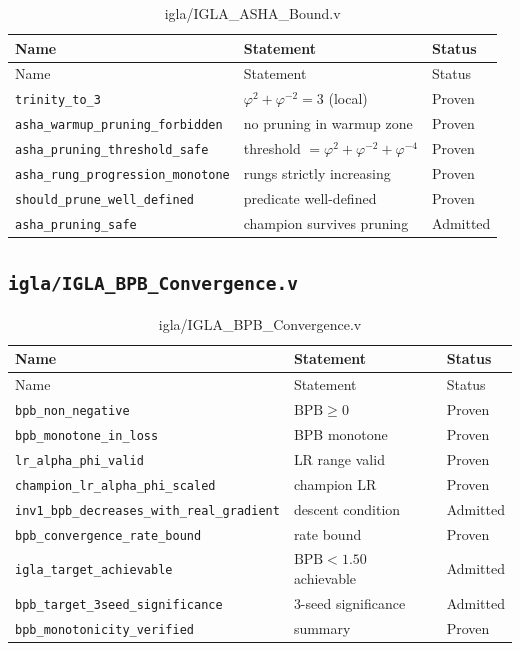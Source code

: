 \begin{longtable}{lll}
\toprule
Name & Statement & Status \\
\midrule
\endfirsthead
\toprule
Name & Statement & Status \\
\midrule
\endhead
\bottomrule
\endfoot
\bottomrule
\caption{igla/IGLA\_ASHA\_Bound.v}
\endlastfoot
\texttt{trinity\_to\_3} &
  $\varphi^{2}+\varphi^{-2}=3$ (local) & Proven \\
\texttt{asha\_warmup\_pruning\_forbidden} &
  no pruning in warmup zone & Proven \\
\texttt{asha\_pruning\_threshold\_safe} &
  threshold $= \varphi^{2}+\varphi^{-2}+\varphi^{-4}$ & Proven \\
\texttt{asha\_rung\_progression\_monotone} &
  rungs strictly increasing & Proven \\
\texttt{should\_prune\_well\_defined} &
  predicate well-defined & Proven \\
\texttt{asha\_pruning\_safe} &
  champion survives pruning & Admitted \\
\end{longtable}

\subsection{\texttt{igla/IGLA\_BPB\_Convergence.v}}
\label{sec:A-coq-bpb}

\begin{longtable}{lll}
\toprule
Name & Statement & Status \\
\midrule
\endfirsthead
\toprule
Name & Statement & Status \\
\midrule
\endhead
\bottomrule
\endfoot
\bottomrule
\caption{igla/IGLA\_BPB\_Convergence.v}
\endlastfoot
\texttt{bpb\_non\_negative} & $\text{BPB}\geq 0$ & Proven \\
\texttt{bpb\_monotone\_in\_loss} & BPB monotone & Proven \\
\texttt{lr\_alpha\_phi\_valid} & LR range valid & Proven \\
\texttt{champion\_lr\_alpha\_phi\_scaled} & champion LR & Proven \\
\texttt{inv1\_bpb\_decreases\_with\_real\_gradient} &
  descent condition & Admitted \\
\texttt{bpb\_convergence\_rate\_bound} & rate bound & Proven \\
\texttt{igla\_target\_achievable} &
  $\text{BPB}<1.50$ achievable & Admitted \\
\texttt{bpb\_target\_3seed\_significance} &
  3-seed significance & Admitted \\
\texttt{bpb\_monotonicity\_verified} & summary & Proven \\
\end{longtable}

